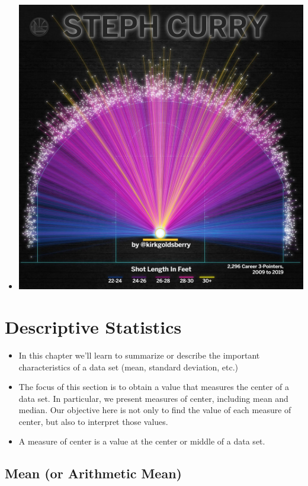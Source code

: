 \documentclass[]{book}
\begin{document}
\begin{itemize}
\item
  \includegraphics{Steph_Curry.jpg}
\end{itemize}

\hypertarget{descriptive-statistics}{%
\chapter{Descriptive Statistics}\label{descriptive-statistics}}

\begin{itemize}
\item
  In this chapter we'll learn to summarize or describe the important characteristics of a data set (mean, standard
  deviation, etc.)
\item
  The focus of this section is to obtain a value that measures the center of a data set. In particular, we present measures of center, including mean and median. Our objective here is not only to find the value of each measure of center, but also to interpret those values.
\item
  A measure of center is a value at the center or middle of a data set.
\end{itemize}

\hypertarget{mean-or-arithmetic-mean}{%
\section{Mean (or Arithmetic Mean)}\label{mean-or-arithmetic-mean}}
\end{document}
